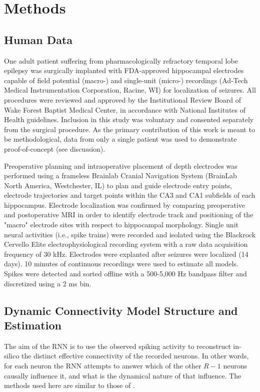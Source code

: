 \documentclass[11pt,a4paper,final]{article}
\begin{document}
\section{Methods \label{SM}}

\subsection{Human Data}

One adult patient suffering from pharmacologically refractory temporal lobe epilepsy was surgically implanted with FDA-approved hippocampal electrodes capable of field potential (macro-) and single-unit (micro-) recordings (Ad-Tech Medical Instrumentation Corporation, Racine, WI) for localization of seizures.
All procedures were reviewed and approved by the Institutional Review Board of Wake Forest Baptist Medical Center, in accordance with National Institutes of Health guidelines.
Inclusion in this study was voluntary and consented separately from the surgical procedure.
As the primary contribution of this work is meant to be methodological, data from only a single patient was used to demonstrate proof-of-concept (see discussion).

Preoperative planning and intraoperative placement of depth electrodes was performed using a frameless Brainlab Cranial Navigation System (BrainLab North America, Westchester, IL) to plan and guide electrode entry points, electrode trajectories and target points within the CA3 and CA1 subfields of each hippocampus.
Electrode localization was confirmed by comparing preoperative and postoperative MRI in order to identify electrode track and positioning of the "macro" electrode sites with respect to hippocampal morphology.
Single unit neural activities (i.e., spike trains) were recorded and isolated using the Blackrock Cervello Elite electrophysiological recording system with a raw data acquisition frequency of 30 kHz.
Electrodes were explanted after seizures were localized (14 days).
10 minutes of continuous recordings were used to estimate all models.
Spikes were detected and sorted offline with a 500-5,000 Hz bandpass filter and discretized using a 2 ms bin.

\subsection{Dynamic Connectivity Model Structure and Estimation}

The aim of the RNN is to use the observed spiking activity to reconstruct in-silico the distinct effective connectivity of the \nn{} recorded neurons.
In other words, for each neuron the RNN attempts to answer which of the other $R-1$ neurons causally influence it, and what is the dynamical nature of that influence. The methods used here are similar to those of \citet{song16sparse}.
\end{document}
